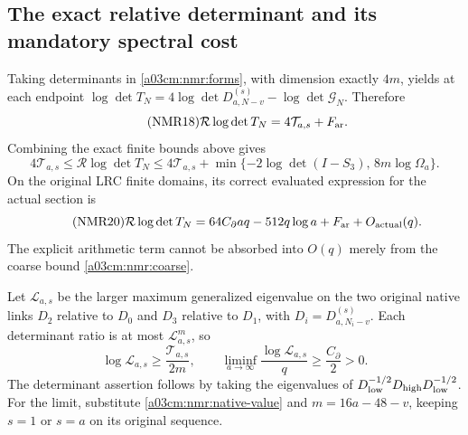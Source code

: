 \documentclass[11pt,a4paper]{article}
\begin{document}
\subsection{The exact relative determinant and its mandatory spectral cost}
Taking determinants in \eqref{a03cm:nmr:forms}, with dimension exactly
$4m$, yields at each endpoint
$\log\det T_N=4\log\det D_{a,N-v}^{(s)}-\log\det\mathcal G_N$.
Therefore
\begin{equation}\tag{NMR18}\label{a03cm:nmr:relative}
\mathcal R\log\det T_N=4\mathcal T_{a,s}+F_{\rm ar}.
\end{equation}
Combining the exact finite bounds above gives
\begin{equation}\tag{NMR19}\label{a03cm:nmr:relative-interval}
4\mathcal T_{a,s}\leq\mathcal R\log\det T_N
\leq4\mathcal T_{a,s}
+\min\{-2\log\det(I-S_3),\,8m\log\Omega_a\}.
\end{equation}
On the original LRC finite domains, its correct evaluated expression
for the actual section is
\begin{equation}\tag{NMR20}\label{a03cm:nmr:relative-asymptotic}
\mathcal R\log\det T_N
=64C_\partial aq-512q\log a+F_{\rm ar}+O_{\rm actual}(q).
\end{equation}
The explicit arithmetic term cannot be absorbed into $O(q)$ merely
from the coarse bound \eqref{a03cm:nmr:coarse}.

Let $\mathscr L_{a,s}$ be the larger maximum generalized eigenvalue
on the two original native links $D_2$ relative to $D_0$ and $D_3$
relative to $D_1$, with $D_i=D_{a,N_i-v}^{(s)}$.
Each determinant ratio is at most $\mathscr L_{a,s}^{m}$,
so
\begin{equation}\tag{NMR21}\label{a03cm:nmr:link-cost}
\log\mathscr L_{a,s}\geq\frac{\mathcal T_{a,s}}{2m},\qquad
\liminf_{a\to\infty}\frac{\log\mathscr L_{a,s}}q
\geq\frac{C_\partial}{2}>0 .
\end{equation}
The determinant assertion follows by taking the eigenvalues of
$D_{\rm low}^{-1/2}D_{\rm high}D_{\rm low}^{-1/2}$.
For the limit, substitute \eqref{a03cm:nmr:native-value} and
$m=16a-48-v$, keeping $s=1$ or $s=a$ on its original sequence.
\end{document}
